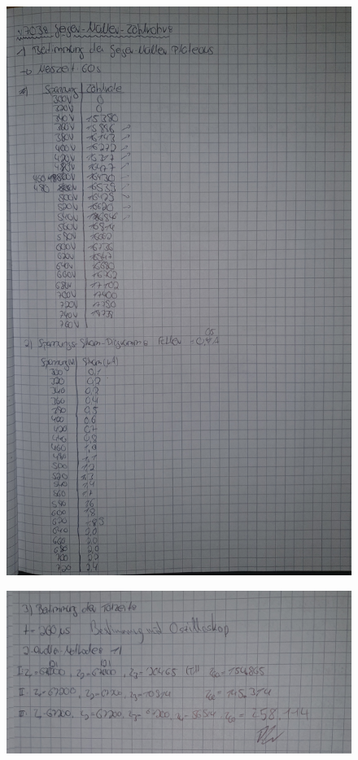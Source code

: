 \begin{figure}[H]
    \centering 
    \includegraphics[width=\textwidth]{content/v703_Laborbuch1.jpg}
\end{figure}

\begin{figure}[H]
    \centering 
    \includegraphics[width=\textwidth]{content/v703_Laborbuch2.jpg}
\end{figure}

%
